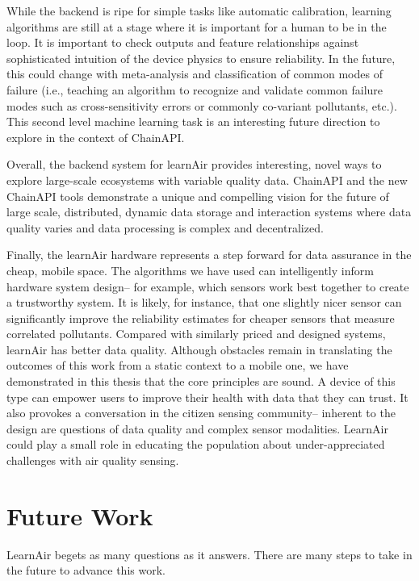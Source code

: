 While the backend is ripe for simple tasks like automatic calibration, learning algorithms are still at a stage where it is important for a human to be in the loop.  It is important to check outputs and feature relationships against sophisticated intuition of the device physics to ensure reliability.  In the future, this could change with meta-analysis and classification of common modes of failure (i.e., teaching an algorithm to recognize and validate common failure modes such as cross-sensitivity errors or commonly co-variant pollutants, etc.).  This second level machine learning task is an interesting future direction to explore in the context of ChainAPI.

Overall, the backend system for learnAir provides interesting, novel ways to explore large-scale ecosystems with variable quality data.  ChainAPI and the new ChainAPI tools demonstrate a unique and compelling vision for the future of large scale, distributed, dynamic data storage and interaction systems where data quality varies and data processing is complex and decentralized.    

Finally, the learnAir hardware represents a step forward for data assurance in the cheap, mobile space.  The algorithms we have used can intelligently inform hardware system design-- for example, which sensors work best together to create a trustworthy system.  It is likely, for instance, that one slightly nicer sensor can significantly improve the reliability estimates for cheaper sensors that measure correlated pollutants.  Compared with similarly priced and designed systems, learnAir has better data quality.  Although obstacles remain in translating the outcomes of this work from a static context to a mobile one, we have demonstrated in this thesis that the core principles are sound.  A device of this type can empower users to improve their health with data that they can trust.  It also provokes a conversation in the citizen sensing community-- inherent to the design are questions of data quality and complex sensor modalities.  LearnAir could play a small role in educating the population about under-appreciated challenges with air quality sensing.

\section{Future Work}

LearnAir begets as many questions as it answers.  There are many steps to take in the future to advance this work.

